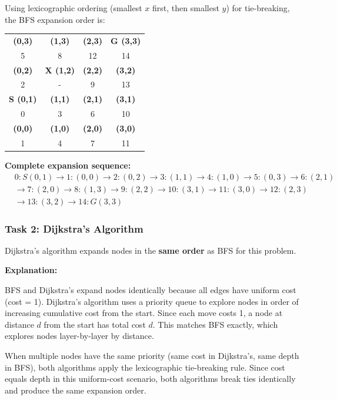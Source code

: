 \documentclass[11pt]{article}
\begin{document}
Using lexicographic ordering (smallest $x$ first, then smallest $y$) for tie-breaking, the BFS expansion order is:

\begin{center}
\begin{tabular}{|c|c|c|c|}
\hline
\textbf{(0,3)} & \textbf{(1,3)} & \textbf{(2,3)} & \textbf{G (3,3)} \\
5 & 8 & 12 & 14 \\
\hline
\textbf{(0,2)} & \textbf{X (1,2)} & \textbf{(2,2)} & \textbf{(3,2)} \\
2 & - & 9 & 13 \\
\hline
\textbf{S (0,1)} & \textbf{(1,1)} & \textbf{(2,1)} & \textbf{(3,1)} \\
0 & 3 & 6 & 10 \\
\hline
\textbf{(0,0)} & \textbf{(1,0)} & \textbf{(2,0)} & \textbf{(3,0)} \\
1 & 4 & 7 & 11 \\
\hline
\end{tabular}
\end{center}

\textbf{Complete expansion sequence:}
\begin{align*}
&0: S(0,1) \rightarrow 1: (0,0) \rightarrow 2: (0,2) \rightarrow 3: (1,1) \rightarrow 4: (1,0) \rightarrow 5: (0,3) \rightarrow 6: (2,1) \\
&\rightarrow 7: (2,0) \rightarrow 8: (1,3) \rightarrow 9: (2,2) \rightarrow 10: (3,1) \rightarrow 11: (3,0) \rightarrow 12: (2,3) \\
&\rightarrow 13: (3,2) \rightarrow 14: G(3,3)
\end{align*}

\subsubsection{Task 2: Dijkstra's Algorithm}

Dijkstra's algorithm expands nodes in the \textbf{same order} as BFS for this problem.

\textbf{Explanation:} 

BFS and Dijkstra's expand nodes identically because all edges have uniform cost (cost = 1). Dijkstra's algorithm uses a priority queue to explore nodes in order of increasing cumulative cost from the start. Since each move costs 1, a node at distance $d$ from the start has total cost $d$. This matches BFS exactly, which explores nodes layer-by-layer by distance.

When multiple nodes have the same priority (same cost in Dijkstra's, same depth in BFS), both algorithms apply the lexicographic tie-breaking rule. Since cost equals depth in this uniform-cost scenario, both algorithms break ties identically and produce the same expansion order.
\end{document}
